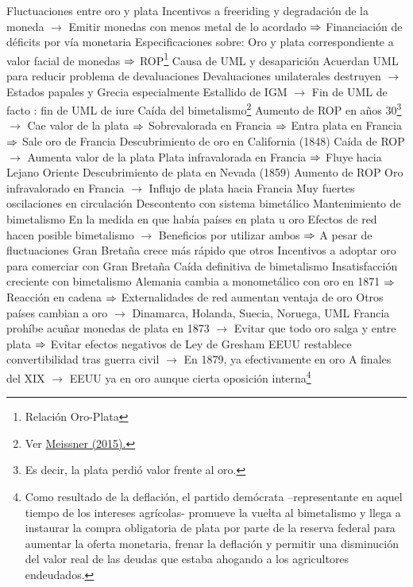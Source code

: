 \documentclass{nuevotema}
\begin{document}
\begin{esquemal}
				\4[] Fluctuaciones entre oro y plata
				\4[] Incentivos a freeriding y degradación de la moneda
				\4[] $\to$ Emitir monedas con menos metal de lo acordado
				\4[] $\then$ Financiación de déficits por vía monetaria
				\4 Especificaciones sobre:
				\4[] Oro y plata correspondiente a valor facial de monedas
				\4[] $\then$ ROP\footnote{Relación Oro-Plata}
				\4[$\then$] Causa de UML y desaparición
				\4[] Acuerdan UML para reducir problema de devaluaciones
				\4[] Devaluaciones unilaterales destruyen
				\4[] $\to$ Estados papales y Grecia especialmente
				\4[] Estallido de IGM
				\4[] $\to$ Fin de UML de facto
				: fin de UML de iure
			\3 Caída del bimetalismo\footnote{Ver \href{https://www.nber.org/papers/w20852.pdf}{Meissner (2015).} }
				\4 Aumento de ROP en años 30\footnote{Es decir, la plata perdió valor frente al oro.}
				\4[] $\to$ Cae valor de la plata
				\4[] $\then$ Sobrevalorada en Francia
				\4[] $\then$ Entra plata en Francia
				\4[] $\then$ Sale oro de Francia
				\4 Descubrimiento de oro en California (1848)
				\4[] Caída de ROP
				\4[] $\to$ Aumenta valor de la plata
				\4[] Plata infravalorada en Francia
				\4[] $\then$ Fluye hacia Lejano Oriente
				\4 Descubrimiento de plata en Nevada (1859)
				\4[] Aumento de ROP
				\4[] Oro infravalorado en Francia
				\4[] $\to$ Influjo de plata hacia Francia
				\4[$\then$] Muy fuertes oscilaciones en circulación
				\4[$\then$] Descontento con sistema bimetálico
				\4 Mantenimiento de bimetalismo
				\4[] En la medida en que había países en plata u oro
				\4[] Efectos de red hacen posible bimetalismo
				\4[] $\to$ Beneficios por utilizar ambos
				\4[] $\then$ A pesar de fluctuaciones
				\4 Gran Bretaña crece más rápido que otros
				\4[] Incentivos a adoptar oro para comerciar con Gran Bretaña
				\4 Caída definitiva de bimetalismo
				\4[] Insatisfacción creciente con bimetalismo
				\4[] Alemania cambia a monometálico con oro en 1871
				\4[] $\then$ Reacción en cadena
				\4[] $\then$ Externalidades de red aumentan ventaja de oro
				\4[] Otros países cambian a oro
				\4[] $\to$ Dinamarca, Holanda, Suecia, Noruega, UML
				\4[] Francia prohíbe acuñar monedas de plata en 1873
				\4[] $\to$ Evitar que todo oro salga y entre plata
				\4[] $\then$ Evitar efectos negativos de Ley de Gresham
				\4[] EEUU restablece convertibilidad tras guerra civil
				\4[] $\to$ En 1879, ya efectivamente en oro
				\4[] A finales del XIX
				\4[] $\to$ EEUU ya en oro aunque cierta oposición interna\footnote{Como resultado de la deflación, el partido demócrata --representante en aquel tiempo de los intereses agrícolas- promueve la vuelta al bimetalismo y llega a instaurar la compra obligatoria de plata por parte de la reserva federal para aumentar la oferta monetaria, frenar la deflación y permitir una disminución del valor real de las deudas que estaba ahogando a los agricultores endeudados.}

\end{esquemal}
\end{document}

